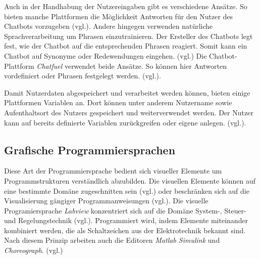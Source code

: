 Auch in der Handhabung der Nutzereingaben gibt es verschiedene Ansätze. So bieten manche Plattformen die Möglichkeit Antworten für den Nutzer des Chatbots vorzugeben (vgl.\cite{Chatfuel3:online}\cite{WelcomeM66:online}). Andere hingegen verwenden natürliche Sprachverarbeitung um Phrasen einzutrainieren. Der Ersteller des Chatbots legt fest, wie der Chatbot auf die entsprechenden Phrasen reagiert. Somit kann ein Chatbot auf Synonyme oder Redewendungen eingehen. (vgl.\cite{BotsifyC64:online}\cite{Dialogfl40:online}\cite{KatalogI56:online}) Die Chatbot-Plattform \emph{Chatfuel} verwendet beide Ansätze. So können hier Antworten vordefiniert oder Phrasen festgelegt werden. (vgl.\cite{Chatfuel3:online}). 

Damit Nutzerdaten abgespeichert und verarbeitet werden können, bieten einige Plattformen Variablen an. Dort können unter anderem Nutzername sowie Aufenthaltsort des Nutzers gespeichert und weiterverwendet werden. Der Nutzer kann auf bereits definierte Variablen zurückgreifen oder eigene anlegen. (vgl.\cite{Chatfuel3:online}\cite{Converse15:online}\cite{Dialogfl40:online}\cite{KatalogI56:online}\cite{WelcomeM66:online}). 


\subsection{Grafische Programmiersprachen}
Diese Art der Programmiersprache bedient sich visueller Elemente um Programmstrukturen verständlich abzubilden. Die visuellen Elemente können auf eine bestimmte Domäne zugeschnitten sein (vgl.\cite{WasistLa94:online}) oder beschränken sich auf die Visualisierung gängiger Programmanweisungen (vgl.\cite{BlocklyG57:online}). Die visuelle Programiersprache \emph{Labview} konzentriert sich auf die Domäne System-, Steuer- und Regelungstechnik (vgl.\cite{WasistLa94:online}). Programmiert wird, indem Elemente miteinander kombiniert werden, die als Schaltzeichen aus der Elektrotechnik bekannt sind. Nach diesem Prinzip arbeiten auch die Editoren \emph{Matlab Simulink} und \emph{Choreograph}. (vgl.\cite{Simulink28:online}\cite{Choregra47:online})

